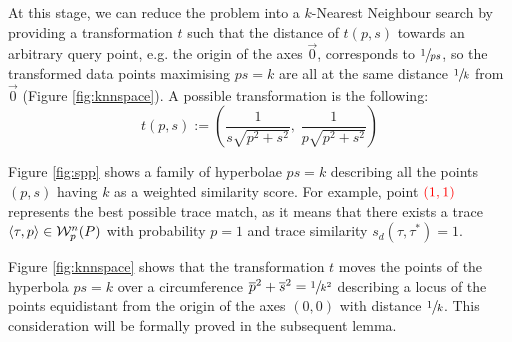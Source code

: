  At this stage, we can reduce the problem into a $k$-Nearest Neighbour search by providing a transformation $t$ such that the distance of $t(p,s)$ towards an arbitrary query point, e.g. the origin of the axes $\vec{0}$, corresponds to $\sfrac{1}{ps}$, so the transformed data points maximising $ps=k$ are all at the same distance $\sfrac{1}{k}$ from $\vec{0}$ (Figure \ref{fig:knnspace}). A possible transformation is the following:
\[t(p,s):=\left(\frac{1}{s\sqrt{p^2+s^2}},\; \frac{1}{p\sqrt{p^2+s^2}}\right)\]

\begin{example}
Figure \ref{fig:spp} shows a family of hyperbolae $ps=k$ describing all the points $(p,s)$ having $k$ as a weighted similarity score. For example,  point $\color{red}(1,1)$ represents the best possible trace match, as it means that there exists a trace $\braket{\tau,p}\in\mathcal{W}_p^n(P)$ with probability $p=1$ and trace similarity $s_d(\tau,\tau^*)=1$.

Figure \ref{fig:knnspace} shows that the transformation $t$ moves the points of the hyperbola $ps=k$ over a circumference $\overline{p}^2+\overline{s}^2=\sfrac{1}{k^2}$ describing a locus of the points equidistant from the origin of the axes $(0,0)$ with distance $\sfrac{1}{k}$. %
This consideration will be formally proved in the subsequent lemma.
\end{example}


